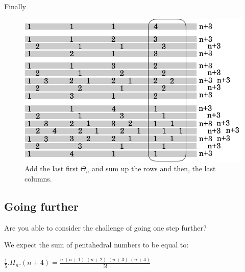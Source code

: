 Finally

\begin{figure}[h]
\begin{center}
        \includegraphics[scale=0.36]{FiguresArithmetic/appTetrahedral5}
        \caption{Add the last first $\Theta_n$ and sum up the rows and then, the last columns.}
        \label{fig:Tetrahedral5}
\end{center}
\end{figure}


\subsection{Going further}

Are you able to consider the challenge of going one step further?

We expect the sum of pentahedral numbers to be equal to:

$\frac{1}{5}.\Pi_n.(n+4) = \frac{n.(n+1).(n+2).(n+3).(n+4)}{5!}$





